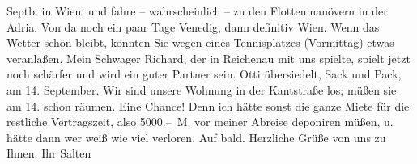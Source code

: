 \begin{ledgroupsized}[t]{13cm}
                  Septb. in Wien, und fahre –
               wahrscheinlich – zu den Flottenmanövern in der Adria. Von da noch ein paar Tage Venedig, dann definitiv Wien. Wenn das
               Wetter schön bleibt, könnten Sie wegen eines Tennisplatzes (Vormittag) etwas
               veranlaßen. Mein Schwager Richard, der in Reichenau mit uns spielte, spielt jetzt noch
               schärfer und wird ein guter Partner sein. Otti
               übersiedelt, Sack und Pack, am 14. September. Wir sind unsere Wohnung in
               der Kantstraße los; müßen sie am 14. schon
               räumen. Eine Chance! Denn ich hätte sonst die ganze Miete für die restliche
               Vertragszeit, also 5000.– M. vor meiner Abreise deponiren müßen, u. hätte dann
               wer weiß wie viel verloren.\pend
           \pstart
           Auf bald.\pend
           \pstart Herzliche Grüße von uns zu Ihnen. Ihr \spacefill\mbox{Salten }\pend{}
         
         \endnumbering{}\end{ledgroupsized}\begin{anhang}\end{anhang}\newcommand{\dateiname}{L03433}\newcommand{\titel}{Felix Salten an Arthur Schnitzler, 23. 8. 1906}\newcommand{\editorInnen}{Martin Anton Müller und Laura Untner}
      